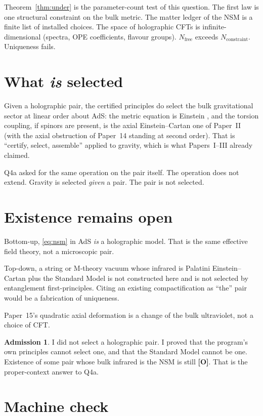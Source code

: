 \documentclass[11pt]{article}
\theoremstyle{definition}
\newtheorem*{admission}{Admission}
\newcommand{\pO}{\textbf{[O]}}
\begin{document}
Theorem~\ref{thm:under} is the parameter-count test of this
question. The first law is one structural constraint on the bulk
metric. The matter ledger of the NSM is a finite list of installed
choices. The space of holographic CFTs is infinite-dimensional
(spectra, OPE coefficients, flavour groups). $N_{\mathrm{free}}$
exceeds $N_{\mathrm{constraint}}$. Uniqueness fails.

\section{What \emph{is} selected}

Given a holographic pair, the certified principles do select the
bulk gravitational sector at linear order about AdS: the metric
equation is Einstein \cite{FGHMV2014}, and the torsion coupling,
if spinors are present, is the axial Einstein--Cartan one of
Paper~II (with the axial obstruction of Paper~14 standing at
second order). That is ``certify, select, assemble'' applied to
gravity, which is what Papers~I--III already claimed.

Q4a asked for the same operation on the pair itself. The operation
does not extend. Gravity is selected \emph{given} a pair. The pair
is not selected.

\section{Existence remains open}

Bottom-up, \eqref{eq:nsm} in AdS \emph{is} a holographic model. That
is the same effective field theory, not a microscopic pair.

Top-down, a string or M-theory vacuum whose infrared is Palatini
Einstein--Cartan plus the Standard Model is not constructed here and
is not selected by entanglement first-principles. Citing an existing
compactification as ``the'' pair would be a fabrication of
uniqueness.

Paper~15's quadratic axial deformation is a change of the bulk
ultraviolet, not a choice of CFT.

\begin{admission}
I did not select a holographic pair. I proved that the program's
own principles cannot select one, and that the Standard Model
cannot be one. Existence of some pair whose bulk infrared is the
NSM is still \pO{}. That is the proper-context answer to Q4a.
\end{admission}

\section{Machine check}
\end{document}
